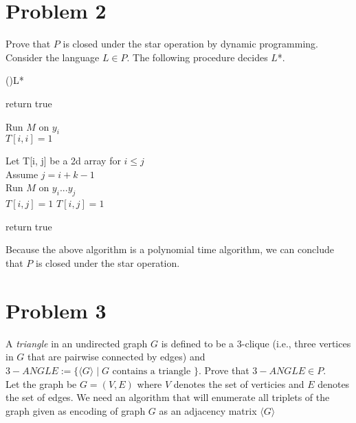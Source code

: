 \documentclass[11pt]{amsart}
\begin{document}
\section*{Problem 2}
Prove that $P$ is closed under the star operation by dynamic programming.\\
Consider the language $L \in P$. The following procedure decides $L$*.\\
\begin{algorithm}[H]
    \Fn(){L*}{
    \SetAlgoLined
    \SetNoFillComment
    \DontPrintSemicolon
         {
            return true
        }

         {
             {
                Run $M$ on $y_i$\\
                $T[i, i] = 1$
            }
        }

        Let T[i, j] be a 2d array for $i \leq j$\\
         {
            Assume $j = i + k - 1$\\
             {
                Run $M$ on $y_i...y_j$\\
                $T[i, j] = 1$
            }
             {
                 {
                    $T[i, j] = 1$
                }
            }
        }

         {
            return true
        }
    }
    \end{algorithm}
\bigskip
Because the above algorithm is a polynomial time algorithm, we can conclude that $P$ is closed under the star operation.
\newpage

\section*{Problem 3}
A \emph{triangle} in an undirected graph $G $ is defined to be a 3-clique (i.e., three vertices in $G$ that are pairwise connected by edges)
and $3-ANGLE := \{ \langle G \rangle \mid G \mbox{ contains a triangle }\}$. Prove that $3-ANGLE \in P$. \\
\hspace*{15mm}Let the graph be $G = (V, E)$ where $V$ denotes the set of verticies and $E$ denotes the set of edges. We need an algorithm that will enumerate all triplets of the graph given as encoding of graph $G$ as an adjacency matrix $\langle G \rangle$\\
\end{document}
